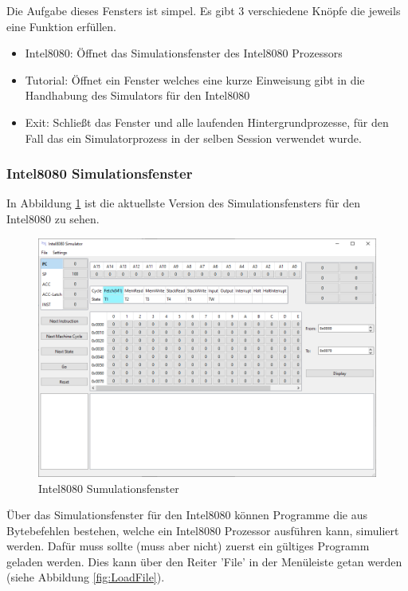 \documentclass[12pt]{article}
\begin{document}
\noindent
Die Aufgabe dieses Fensters ist simpel. Es gibt 3 verschiedene Knöpfe die jeweils eine Funktion erfüllen.
\begin{itemize}
	\item Intel8080: Öffnet das Simulationsfenster des Intel8080 Prozessors
	\item Tutorial: Öffnet ein Fenster welches eine kurze Einweisung gibt in die Handhabung des Simulators für den Intel8080
	\item Exit: Schließt das Fenster und alle laufenden Hintergrundprozesse, für den Fall das ein Simulatorprozess in der selben Session verwendet wurde.
\end{itemize}

\subsubsection{Intel8080 Simulationsfenster}
In Abbildung \ref{fig:I8080MW} ist die aktuellste Version des Simulationsfensters für den Intel8080 zu sehen.\vspace{10pt}

\begin{figure}[h]
\centering
\includegraphics[width=15cm]{bilder/Intel8080_MainWindow}
\caption{Intel8080 Sumulationsfenster}
\label{fig:I8080MW}
\end{figure}

\noindent
Über das Simulationsfenster für den Intel8080 können Programme die aus Bytebefehlen bestehen, welche ein Intel8080 Prozessor ausführen kann, simuliert werden. Dafür muss sollte (muss aber nicht) zuerst ein gültiges Programm geladen werden. Dies kann über den Reiter 'File' in der Menüleiste getan werden (siehe Abbildung \ref{fig:LoadFile}).\vspace{10pt}
\end{document}
